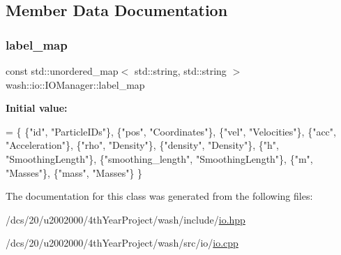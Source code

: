 \subsection{Member Data Documentation}
\mbox{\label{classwash_1_1io_1_1IOManager_ae2918fb006b6571b0eeceed90d2685b4}} 
\subsubsection{\texorpdfstring{label\+\_\+map}{label\_map}}
{\footnotesize\ttfamily const std\+::unordered\+\_\+map$<$ std\+::string, std\+::string $>$ wash\+::io\+::\+I\+O\+Manager\+::label\+\_\+map\hspace{0.3cm}{\ttfamily [static]}}

{\bfseries Initial value\+:}
\begin{DoxyCode}
= \{ 
        \{\textcolor{stringliteral}{"id"}, \textcolor{stringliteral}{"ParticleIDs"}\},
        \{\textcolor{stringliteral}{"pos"}, \textcolor{stringliteral}{"Coordinates"}\},
        \{\textcolor{stringliteral}{"vel"}, \textcolor{stringliteral}{"Velocities"}\},
        \{\textcolor{stringliteral}{"acc"}, \textcolor{stringliteral}{"Acceleration"}\},
        \{\textcolor{stringliteral}{"rho"}, \textcolor{stringliteral}{"Density"}\},
        \{\textcolor{stringliteral}{"density"}, \textcolor{stringliteral}{"Density"}\},
        \{\textcolor{stringliteral}{"h"}, \textcolor{stringliteral}{"SmoothingLength"}\},
        \{\textcolor{stringliteral}{"smoothing\_length"}, \textcolor{stringliteral}{"SmoothingLength"}\},
        \{\textcolor{stringliteral}{"m"}, \textcolor{stringliteral}{"Masses"}\},
        \{\textcolor{stringliteral}{"mass"}, \textcolor{stringliteral}{"Masses"}\}
    \}
\end{DoxyCode}


The documentation for this class was generated from the following files\+:\begin{DoxyCompactItemize}
\item 
/dcs/20/u2002000/4th\+Year\+Project/wash/include/\mbox{\hyperlink{io_8hpp}{io.\+hpp}}\item 
/dcs/20/u2002000/4th\+Year\+Project/wash/src/io/\mbox{\hyperlink{io_2io_8cpp}{io.\+cpp}}\end{DoxyCompactItemize}
